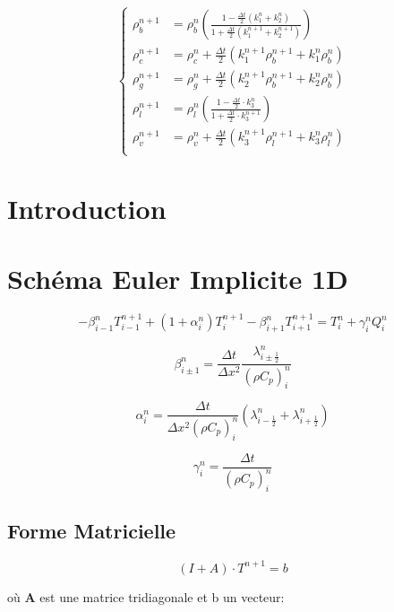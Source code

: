 \documentclass[a4paper,11pt]{article}
\begin{document}
\begin{equation}\label{eq:CK}
	\left\lbrace
		\begin{aligned}
			\rho_b^{n+1} &= \rho_b^n \left( \frac{1 - \frac{\Delta t}{2}(k_1^n + k_2^n) }{1 +\frac{\Delta t}{2}(k_1^{n+1} + k_2^{n+1}) }\right)  \\
                \rho_c^{n+1} &= \rho_c^n + \frac{\Delta t}{2} \left( k_1^{n+1} \rho_b^{n+1} + k_1^n \rho_b^n \right) \\
                \rho_g^{n+1} &= \rho_g^n + \frac{\Delta t}{2} \left( k_2^{n+1} \rho_b^{n+1} + k_2^n \rho_b^n \right) \\
                \rho_l^{n+1} &= \rho_l^n \left(\frac{ 1 - \frac{\Delta t}{2} \cdot k_3^n }{ 1 + \frac{\Delta t}{2} \cdot k_3^{n+1} }\right)  \\
                \rho_v^{n+1} &= \rho_v^n + \frac{\Delta t}{2} \left( k_3^{n+1} \rho_l^{n+1} + k_3^n \rho_l^n \right) \\
		\end{aligned}
	\right.
\end{equation}

\section{Introduction}

\section*{Schéma Euler Implicite 1D}

\[
- \beta_{i-1}^{n} T_{i-1}^{n+1} + (1 + \alpha_i^n) T_i^{n+1} - \beta_{i+1}^{n} T_{i+1}^{n+1} = T_i^n + \gamma_i^n Q_i^n
\]

\[
\beta_{i \pm 1}^{n} = \frac{\Delta t}{\Delta x^2} \frac{\lambda_{i \pm \frac{1}{2}}^n}{(\rho C_p)_i^n}
\]

\[
\alpha_i^n = \frac{\Delta t}{\Delta x^2 (\rho C_p)_i^n} \left( \lambda_{i - \frac{1}{2}}^n + \lambda_{i + \frac{1}{2}}^n \right)
\]

\[
\gamma_i^n = \frac{\Delta t}{(\rho C_p)_i^n}
\]

\subsection*{Forme Matricielle}

\[
(I + A) \cdot T^{n+1} = b
\]

où $\mathbf{A}$ est une matrice tridiagonale et b un vecteur:
\end{document}
